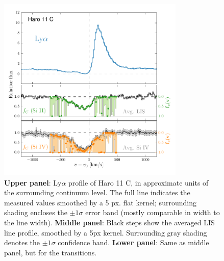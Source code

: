 \documentclass[twocolumn,]{aastex61}
\begin{document}
\begin{figure}
\centering
\includegraphics[width=3.500in]{./LyACoverfracs.pdf}
\caption{\textbf{Upper panel}: Ly$\alpha$ profile of Haro 11 C, in
approximate units of the surrounding continuum level. The full line
indicates the measured values smoothed by a 5 px. flat kernel; surrounding shading
encloses the $\pm 1 \sigma$ error band (mostly comparable in width to
the line width). \textbf{Middle panel}: Black steps show the averaged
LIS line profile, smoothed by a 5px kernel. Surrounding gray shading
denotes the $\pm 1 \sigma$ confidence band. \textbf{Lower panel}: Same
as middle panel, but for the  transitions.
}\label{fig:HisLisLya}
\end{figure}
\end{document}
